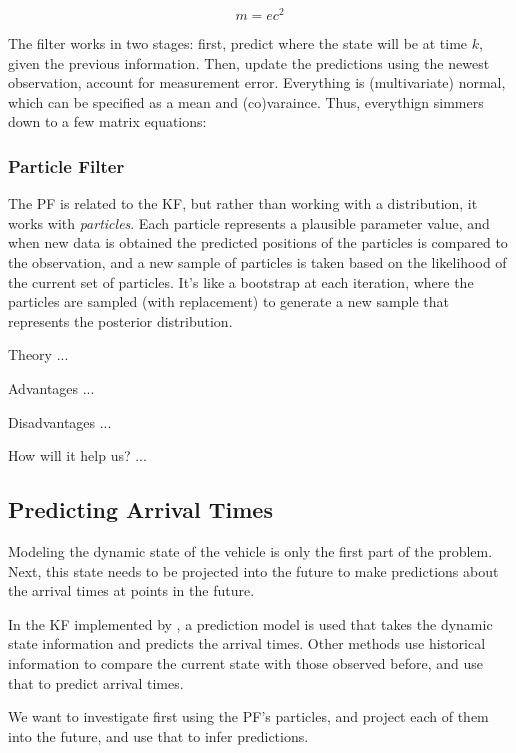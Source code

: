 \documentclass[12pt,a4paper]{article}
\begin{document}
\begin{equation}
  \label{eq:kalman_filter}
  m = ec^2
\end{equation}

The filter works in two stages: first, predict where the state will be at time $k$, given the previous information.
Then, update the predictions using the newest observation, account for measurement error.
Everything is (multivariate) normal, which can be specified as a mean and (co)varaince.
Thus, everythign simmers down to a few matrix equations:

\subsubsection{Particle Filter}
\label{sec:particle_filter}

The PF is related to the KF, but rather than working with a distribution, it works with \emph{particles}.
Each particle represents a plausible parameter value, and when new data is obtained the predicted positions of the
particles is compared to the observation, and a new sample of particles is taken based on the likelihood of the current set of particles.
It's like a bootstrap at each iteration, where the particles are sampled (with replacement) to generate a new sample that represents the posterior distribution.

Theory ...

Advantages ...

Disadvantages ...

How will it help us? ...


\subsection{Predicting Arrival Times}
\label{sec:predicting_arival_times}

Modeling the dynamic state of the vehicle is only the first part of the problem.
Next, this state needs to be projected into the future to make predictions about
the arrival times at points in the future.

In the KF implemented by \cite{cathey-dailey:2003}, 
a prediction model is used that takes the dynamic state information and predicts the arrival times.
Other methods use historical information to compare the current state with those observed before,
and use that to predict arrival times.

We want to investigate first using the PF's particles, and project each of them into the future, 
and use that to infer predictions.
\end{document}
